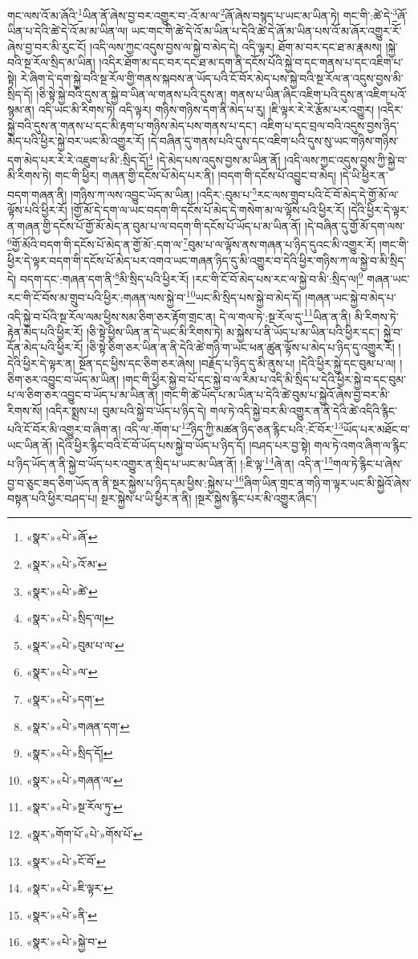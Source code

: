 གང་ལས་འོ་མ་ཞོའི་\footnote{«སྣར་»«པེ་»ཞོ་}ཡིན་ནོ་ཞེས་བྱ་བར་འགྱུར་བ་:འོ་མ་ལ་\footnote{«སྣར་»«པེ་»འོ་མ་}ཞོ་ཞེས་བསྙད་པ་ཡང་མ་ཡིན་ཏེ། གང་གི་:ཚེ་དེ་\footnote{«སྣར་»«པེ་»ཚེ་}ཞོ་ཡིན་པ་དེའི་ཚེ་དེ་འོ་མ་མ་ཡིན་ལ། ཡང་གང་གི་ཚེ་དེ་འོ་མ་ཡིན་པ་དེའི་ཚེ་དེ་ཞོ་མ་ཡིན་པས་འོ་མ་ཞོར་འགྱུར་རོ་ཞེས་བྱ་བར་མི་རུང་ངོ། །འདི་ལས་ཀྱང་འདུས་བྱས་ལ་སྐྱེ་བ་མེད་དེ། འདི་ལྟར། ཐོག་མ་བར་དང་ཐ་མ་རྣམས། །སྐྱེ་བའི་སྔ་རོལ་སྲིད་མ་ཡིན། །འདིར་ཐོག་མ་དང་བར་དང་ཐ་མ་དག་ནི་དངོས་པོའི་སྐྱེ་བ་དང་གནས་པ་དང་འཇིག་པ་སྟེ། རེ་ཞིག་དེ་དག་སྐྱེ་བའི་སྔ་རོལ་གྱི་གནས་སྐབས་ན་ཡོད་པའི་ངོ་བོར་མེད་པས་སྐྱེ་བའི་སྔ་རོལ་ན་འདུས་བྱས་མི་སྲིད་དོ། །ཅི་སྟེ་སྐྱེ་བའི་དུས་ན་སྐྱེ་བ་ཡིན་ལ་གནས་པའི་དུས་ན། གནས་པ་ཡིན་ཞིང་འཇིག་པའི་དུས་ན་འཇིག་པའོ་སྙམ་ན། འདི་ཡང་མི་རིགས་ཏེ། འདི་ལྟར། གཉིས་གཉིས་དག་ནི་མེད་པ་རུ། །ཇི་ལྟར་རེ་རེ་རྩོམ་པར་འགྱུར། །འདིར་སྐྱེ་བའི་དུས་ན་གནས་པ་དང་མི་རྟག་པ་གཉིས་མེད་པས་གནས་པ་དང་། འཇིག་པ་དང་བྲལ་བའི་འདུས་བྱས་ཉིད་མེད་པའི་ཕྱིར་སྐྱེ་བར་ཡང་མི་འགྱུར་རོ། །དེ་བཞིན་དུ་གནས་པའི་དུས་དང་འཇིག་པའི་དུས་སུ་ཡང་གཉིས་གཉིས་དག་མེད་པར་རེ་རེ་འཇུག་པ་མི་:སྲིད་དོ།\footnote{«སྣར་»«པེ་»སྲིད་ལ།} །དེ་མེད་པས་འདུས་བྱས་མ་ཡིན་ནོ། །འདི་ལས་ཀྱང་འདུས་བྱས་ཀྱི་སྐྱེ་བ་མི་རིགས་ཏེ། གང་གི་ཕྱིར། གཞན་གྱི་དངོས་པོ་མེད་པར་ནི། །བདག་གི་དངོས་པོ་འབྱུང་བ་མེད། །དེ་ཡི་ཕྱིར་ན་བདག་གཞན་ནི། །གཉིས་ཀ་ལས་འབྱུང་ཡོད་མ་ཡིན། །འདིར་:བུམ་པ་\footnote{«སྣར་»«པེ་»བུམ་པ་ལ་}རང་ལས་གྲུབ་པའི་ངོ་བོ་མེད་དེ་གྱོ་མོ་ལ་ལྟོས་པའི་ཕྱིར་རོ། །གྱོ་མོ་དེ་དག་ལ་ཡང་བདག་གི་དངོས་པོ་མེད་དེ་གསེག་མ་ལ་ལྟོས་པའི་ཕྱིར་རོ། །དེའི་ཕྱིར་དེ་ལྟར་ན་གཞན་གྱི་དངོས་པོ་གྱོ་མོ་མེད་ན་བུམ་པ་ལ་བདག་གི་དངོས་པོ་ཡོད་པ་མ་ཡིན་ནོ། །དེ་བཞིན་དུ་གྱོ་མོ་དག་ལས་\footnote{«སྣར་»«པེ་»ལ་}གྱོ་མོའི་བདག་གི་དངོས་པོ་མེད་ན་གྱོ་མོ་:དག་ལ་\footnote{«སྣར་»«པེ་»དག་}བུམ་པ་ལ་ལྟོས་ནས་གཞན་པ་ཉིད་དུའང་མི་འགྱུར་རོ། །གང་གི་ཕྱིར་དེ་ལྟར་བདག་གི་དངོས་པོ་མེད་པར་འགའ་ཡང་གཞན་ཉིད་དུ་མི་འགྱུར་བ་དེའི་ཕྱིར་གཉིས་ཀ་ལ་སྐྱེ་བ་མི་སྲིད་དེ། བདག་དང་:གཞན་དག་ནི་\footnote{«སྣར་»«པེ་»གཞན་དག་}མི་སྲིད་པའི་ཕྱིར་རོ། །རང་གི་ངོ་བོ་མེད་པས་རང་ལ་སྐྱེ་བ་མི་:སྲིད་ལ།\footnote{«སྣར་»«པེ་»སྲིད་དོ།} གཞན་ཡང་རང་གི་ངོ་བོས་མ་གྲུབ་པའི་ཕྱིར་:གཞན་ལས་སྐྱེ་བ་\footnote{«སྣར་»«པེ་»གཞན་ལ་}ཡང་མི་སྲིད་པས་སྐྱེ་བ་མེད་དོ། །གཞན་ཡང་སྐྱེ་བ་མེད་པ་འདི་སྐྱེ་བ་པོའི་སྔ་རོལ་ལམ་ཕྱིས་སམ་ཅིག་ཅར་རྟོག་གྲང་ན། དེ་ལ་གལ་ཏེ་:སྔ་རོལ་དུ་\footnote{«སྣར་»«པེ་»སྔ་རོལ་ཏུ་}ཡིན་ན་ནི། མི་རིགས་ཏེ་རྟེན་མེད་པའི་ཕྱིར་རོ། །ཅི་སྟེ་ཕྱིས་ཡིན་ན་དེ་ཡང་མི་རིགས་ཏེ། མ་སྐྱེས་པ་ནི་ཡོད་པ་མ་ཡིན་པའི་ཕྱིར་དང་། སྐྱེ་བ་དོན་མེད་པའི་ཕྱིར་རོ། །ཅི་སྟེ་ཅིག་ཅར་ཡིན་ན་ནི་དེའི་ཚེ་གཉི་ག་ཡང་ཕན་ཚུན་ལྟོས་པ་མེད་པ་ཉིད་དུ་འགྱུར་རོ། །དེའི་ཕྱིར་དེ་ལྟར་ན། སྔོན་དང་ཕྱིས་དང་ཅིག་ཅར་ཞེས། །བརྗོད་པ་ཉིད་དུ་མི་ནུས་པ། །དེའི་ཕྱིར་སྐྱེ་དང་བུམ་པ་ལ། །ཅིག་ཅར་འབྱུང་བ་ཡོད་མ་ཡིན། །གང་གི་ཕྱིར་སྐྱེ་བ་པོ་དང་སྐྱེ་བ་ལ་རིམ་པ་འདི་མི་སྲིད་པ་དེའི་ཕྱིར་སྐྱེ་བ་དང་བུམ་པ་ལ་ཅིག་ཅར་འབྱུང་བ་ཡོད་པ་མ་ཡིན་ནོ། །གང་གི་ཚེ་ཡོད་པ་མ་ཡིན་པ་དེའི་ཚེ་བུམ་པ་སྐྱེའོ་ཞེས་བྱ་བར་མི་རིགས་སོ། །འདིར་སྨྲས་པ། བུམ་པའི་སྐྱེ་བ་ཡོད་པ་ཉིད་དེ། གལ་ཏེ་འདི་སྐྱེ་བར་མི་འགྱུར་ན་ནི་དེའི་ཚེ་འདིའི་རྙིང་པའི་ངོ་བོར་མི་འགྱུར་བ་ཞིག་ན། འདི་ལ་:གོག་པ་\footnote{«སྣར་»གོག་པོ་«པེ་»གོས་པོ་}ཉིད་ཀྱི་མཚན་ཉིད་ཅན་རྙིང་པའི་:ངོ་བོར་\footnote{«སྣར་»«པེ་»ངོ་བོ་}ཡོད་པར་མཐོང་བ་ཡང་ཡིན་ནོ། །དེའི་ཕྱིར་རྙིང་བའི་ངོ་བོ་ཡོད་པས་སྐྱེ་བ་ཡོད་པ་ཉིད་དོ། །བཤད་པར་བྱ་སྟེ། གལ་ཏེ་འགའ་ཞིག་ལ་རྙིང་པ་ཉིད་ཡོད་ན་ནི་སྐྱེ་བ་ཡོད་པར་འགྱུར་ན་སྲིད་པ་ཡང་མ་ཡིན་ནོ། །:ཇི་ལྟ་\footnote{«སྣར་»«པེ་»ཇི་ལྟར་}ཞེ་ན། འདི་ན་\footnote{«སྣར་»«པེ་»ནི་}གལ་ཏེ་རྙིང་པ་ཞེས་བྱ་བ་ཅུང་ཟད་ཅིག་ཡོད་ན་ནི་སྔར་སྐྱེས་པ་ཉིད་དམ་ཕྱིས་:སྐྱེས་པ་\footnote{«སྣར་»«པེ་»སྐྱེ་བ་}ཞིག་ཡིན་གྲང་ན་གཉི་ག་ལྟར་ཡང་མི་སྐྱེའོ་ཞེས་བསྟན་པའི་ཕྱིར་བཤད་པ། སྔར་སྐྱེས་པ་ཡི་ཕྱིར་ན་ནི། །སྔར་སྐྱེས་རྙིང་པར་མི་འགྱུར་ཞིང་། 